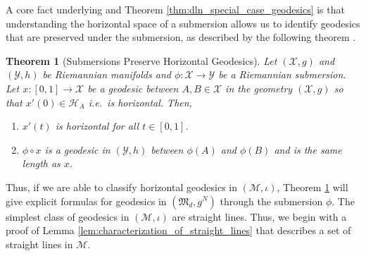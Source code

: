 \documentclass{amsart}
\newtheorem{theorem}{Theorem}[section]
\theoremstyle{definition}
\theoremstyle{remark}
\numberwithin{equation}{section}
\begin{document}
A core fact underlying \cite[Section 4]{bhatia2019bures} and Theorem \ref{thm:dln_special_case_geodesics} is that understanding the horizontal space of a submersion allows us to identify geodesics that are preserved under the submersion, as described by the following theorem \cite{oneill1966fundamental, bhatia2019bures}.
\begin{theorem}[Submersions Preserve Horizontal Geodesics]\label{thm:horizontal_geodesic_submersion}
    Let $(\mathcal{X}, g)$ and $(\mathcal{Y}, h)$ be Riemannian manifolds and $\phi: \mathcal{X} \to \mathcal{Y}$ be a Riemannian submersion. Let $x: [0,1] \to \mathcal{X}$ be a geodesic between $A, B \in \mathcal{X}$ in the geometry $(\mathcal{X}, g)$ so that $x'(0) \in \mathcal{H}_{A}$ i.e.\ is horizontal. Then,
    \begin{enumerate}
        \item $x'(t)$ is horizontal for all $t \in [0,1]$.
        \item $\phi \circ x$ is a geodesic in $(\mathcal{Y}, h)$ between $\phi(A)$ and $\phi(B)$ and is the same length as $x$.
    \end{enumerate}
\end{theorem}
Thus, if we are able to classify horizontal geodesics in $(\mathcal{M}, \iota)$, Theorem \ref{thm:horizontal_geodesic_submersion} will give explicit formulas for geodesics in $(\mathfrak{M}_d, g^N)$ through the submersion $\phi$. The simplest class of geodesics in $(\mathcal{M}, \iota)$ are straight lines. Thus, we begin with a proof of Lemma \ref{lem:characterization_of_straight_lines} that describes a set of straight lines in $\mathcal{M}$.
\end{document}
